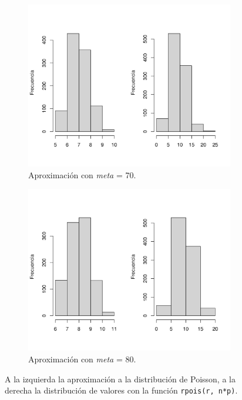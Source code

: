 \documentclass[12pt]{article}
\begin{document}
	\begin{figure}
		\begin{subfigure}{\textwidth}
			\centering
			\includegraphics[scale=0.7]{poisson_binom-p001-n1000-m70-r1000.png}
			\caption{Aproximación con {\em meta} = 70.}
			\label{poisson_binom-m70}
		\end{subfigure}
	
		\begin{subfigure}{\textwidth}
			\centering
			\includegraphics[scale=0.7]{poisson_binom-p001-n1000-m80-r1000.png}
			\caption{Aproximación con {\em meta} = 80.}
			\label{poisson_binom-m80}
		\end{subfigure}
		\caption{A la izquierda la aproximación a la distribución de Poisson, a la derecha la distribución de valores con la función \texttt{rpois(r, n*p)}.}
		\label{poisson_binom}
	\end{figure}
	
\end{document}
